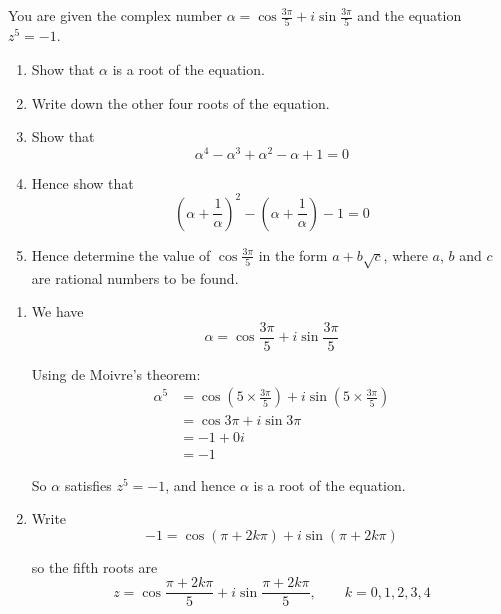 \documentclass[leqno]{article}
\begin{document}
\begin{enumerate}[
  label=\textbf{\arabic*.},
  leftmargin=*,
  topsep=0pt,
  partopsep=0pt,
  parsep=0pt
]
\begin{djsSolution}
\begin{enumerate}[label=\textbf{(\alph*)}]
\end{enumerate}
\end{djsSolution}


\newpage

\questionitem

You are given the complex number $\alpha=\cos \frac{3\pi}{5}+i\sin \frac{3\pi}{5}$ and the equation $z^5=-1$. \\
\begin{enumerate}[label=\textbf{(\alph*)}]
  \item Show that $\alpha$ is a root of the equation.  \\
  \item Write down the other four roots of the equation.  \\
  \item Show that
  \[
  \alpha^4-\alpha^3+\alpha^2-\alpha+1=0
  \]
  \item Hence show that
  \[
  \left(\alpha+\frac{1}{\alpha}\right)^2-\left(\alpha+\frac{1}{\alpha}\right)-1=0
  \]
  \item Hence determine the value of $\cos \frac{3\pi}{5}$ in the form $a+b\sqrt{c}$, where $a$, $b$ and $c$ are rational numbers to be found.  \\
\end{enumerate}

\vspace*{10pt}

\begin{djsSolution}
\begin{enumerate}[label=\textbf{(\alph*)}]
  \item We have
\[
\alpha=\cos\frac{3\pi}{5}+i\sin\frac{3\pi}{5}
\]

Using de Moivre's theorem:
\begin{align*}
\alpha^5
&=\cos\left(5\times\frac{3\pi}{5}\right)+i\sin\left(5\times\frac{3\pi}{5}\right) \\
&=\cos 3\pi+i\sin 3\pi \\
&=-1+0i \\
&=-1
\end{align*}

So $\alpha$ satisfies $z^5=-1$, and hence $\alpha$ is a root of the equation.

  \item Write
\[
-1=\cos(\pi+2k\pi)+i\sin(\pi+2k\pi)
\]

so the fifth roots are
\[
z=\cos\frac{\pi+2k\pi}{5}+i\sin\frac{\pi+2k\pi}{5},
\qquad k=0,1,2,3,4
\]


\end{enumerate}
\end{djsSolution}
\end{enumerate}
\end{document}
